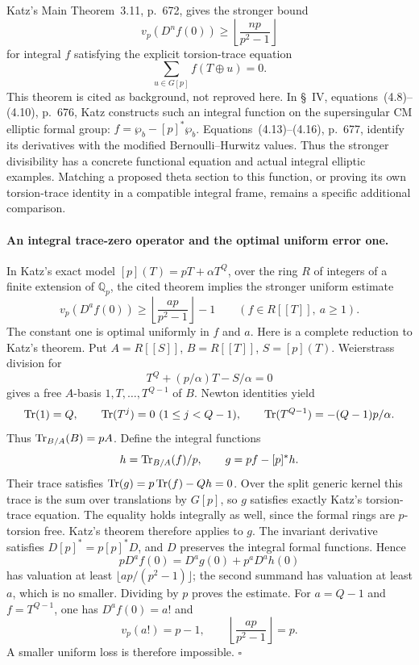 \documentclass[11pt]{article}
\newcommand{\Q}{\mathbb Q}\newcommand{\C}{\mathbb C}\newcommand{\Z}{\mathbb Z}\newcommand{\R}{\mathbb R}\newcommand{\A}{\mathbb A}\newcommand{\OO}{\mathcal O}
\theoremstyle{definition}\newtheorem{definition}[theorem]{Definition}\newtheorem{remark}[theorem]{Remark}
\begin{document}
Katz's Main Theorem~3.11, p.~672, gives the stronger bound
\[
 v_p(D^nf(0))\geq\left\lfloor\frac{np}{p^2-1}\right\rfloor
\]
for integral $f$ satisfying the explicit torsion-trace equation
\[
 \sum_{u\in G[p]}f(T\mathbin\oplus u)=0.
\]
This theorem is cited as background, not reproved here.
In \S~IV, equations~(4.8)--(4.10), p.~676, Katz constructs such an
integral function on the supersingular CM elliptic formal group:
$f=\wp_b-[p]^*\wp_b$. Equations~(4.13)--(4.16), p.~677, identify
its derivatives with the modified Bernoulli--Hurwitz values.
Thus the stronger divisibility has a concrete functional equation
and actual integral elliptic examples. Matching a proposed theta
section to this function, or proving its own torsion-trace identity
in a compatible integral frame, remains a specific additional
comparison.

\paragraph{An integral trace-zero operator and the optimal uniform error one.}
In Katz's exact model $[p](T)=pT+\alpha T^Q$, over the ring $R$
of integers of a finite extension of $\Q_p$, the cited theorem
implies the stronger uniform estimate
\[
 v_p(D^af(0))\geq
       \left\lfloor\frac{ap}{p^2-1}\right\rfloor-1
       \qquad(f\in R[[T]],\ a\geq1).
\]
The constant one is optimal uniformly in $f$ and $a$.
Here is a complete reduction to Katz's theorem. Put
$A=R[[S]]$, $B=R[[T]]$, $S=[p](T)$. Weierstrass division for
\[
 T^Q+(p/\alpha)T-S/\alpha=0
\]
gives a free $A$-basis $1,T,\ldots,T^{Q-1}$ of $B$.
Newton identities yield
\[
 \operatorname{Tr}(1)=Q,\qquad \operatorname{Tr}(T^j)=0\ (1\leq j<Q-1),\qquad
 \operatorname{Tr}(T^{Q-1})=-(Q-1)p/\alpha.
\]
Thus $\operatorname{Tr}_{B/A}(B)=pA$. Define the integral functions
\[
 h=\operatorname{Tr}_{B/A}(f)/p,\qquad
 g=pf-[p]^*h.
\]
Their trace satisfies $\operatorname{Tr}(g)=p\operatorname{Tr}(f)-Qh=0$.
Over the split generic kernel this trace is the sum over translations
by $G[p]$, so $g$ satisfies exactly Katz's torsion-trace equation.
The equality holds integrally as well, since the formal rings are
$p$-torsion free. Katz's theorem therefore applies to $g$.
The invariant derivative satisfies $D[p]^*=p[p]^*D$, and $D$
preserves the integral formal functions. Hence
\[
 pD^af(0)=D^ag(0)+p^aD^ah(0)
\]
has valuation at least $\lfloor ap/(p^2-1)\rfloor$; the second
summand has valuation at least $a$, which is no smaller.
Dividing by $p$ proves the estimate. For $a=Q-1$ and
$f=T^{Q-1}$, one has $D^af(0)=a!$ and
\[
 v_p(a!)=p-1,
 \qquad\left\lfloor\frac{ap}{p^2-1}\right\rfloor=p.
\]
A smaller uniform loss is therefore impossible. $\square$
\end{document}
